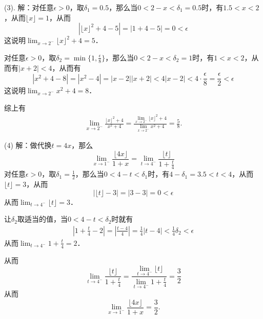 \noindent (3). 解：对任意$\epsilon > 0$，取$\delta_1 = 0.5$，那么当$0 < 2-x < \delta_1 = 0.5$时，有$1.5 < x < 2$，从而$\lfloor x \rfloor = 1$，从而
\begin{equation}
    |\lfloor x \rfloor^2 + 4 - 5| = |1 + 4 - 5| = 0 < \epsilon
\end{equation}
这说明$\displaystyle\lim_{x \to 2^-} \lfloor x \rfloor^2 + 4 = 5$．

\noindent 对任意$\epsilon > 0$，取$\delta_2 = \min \{ 1, \displaystyle\frac{\epsilon}{8} \}$，那么当$0 < 2 - x < \delta_2 = 1$时，有$1 < x < 2$，从而有$|x+2| < 4$，从而有
\begin{equation}
    |x^2 + 4 - 8| = |x^2 - 4| = |x-2||x+2| < 4 |x-2| < 4 \cdot \frac{\epsilon}{8} = \frac{\epsilon}{2} < \epsilon
\end{equation}
这说明$\displaystyle\lim_{x \to 2^-} x^2 + 4 = 8$．

\noindent 综上有
\begin{align}
    \lim_{x \to 2^-} \frac{\lfloor x \rfloor^2 + 4}{x^2 + 4} = \frac{\displaystyle\lim_{x \to 2^-} \lfloor x \rfloor^2 + 4}{\displaystyle\lim_{x \to 2^-} x^2 + 4} = \frac{5}{8}.
\end{align}

\noindent (4) 解：做代换$t = 4x$，那么
\begin{equation}
    \lim_{x \to 1^-} \frac{\lfloor 4x \rfloor}{1+x} = \lim_{t \to 4^-} \frac{\lfloor t \rfloor}{1+\displaystyle\frac{t}{4}}
\end{equation}
对任意$\epsilon > 0$，取$\delta_1 = \displaystyle\frac{1}{2}$，那么当$0 < 4 - t < \delta_1$时，有$4 - \delta_1 = 3.5 < t < 4$，从而$\lfloor t \rfloor = 3$，从而
\begin{equation}
    |\lfloor t \rfloor - 3| = |3 - 3| = 0 < \epsilon
\end{equation}
从而$\displaystyle\lim_{t \to 4^-} \lfloor t \rfloor = 3$．

\noindent 让$\delta_2$取适当的值，当$0 < 4-t < \delta_2$时就有
\begin{align}
    |1 + \frac{t}{4} - 2| = |\frac{t-4}{4}| = \frac{1}{4}|t-4| < \frac{1}{4}\delta_2 < \epsilon
\end{align}
从而$\displaystyle\lim_{t \to 4^-} 1 + \displaystyle\frac{t}{4} = 2$．

\noindent 从而
\begin{equation}
    \lim_{t \to 4^-} \frac{\lfloor t \rfloor}{1+\displaystyle\frac{t}{4}} = \frac{\displaystyle\lim_{t \to 4^-} \lfloor t \rfloor}{\displaystyle\lim_{t \to 4^-} 1 + \displaystyle\frac{t}{4}} = \frac{3}{2}
\end{equation}
从而
\begin{equation}
    \lim_{x \to 1^-} \frac{\lfloor 4x \rfloor}{1+x} = \frac{3}{2}.
\end{equation}

